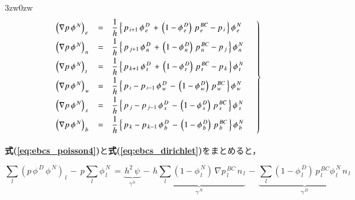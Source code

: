\begin{indentation}{3zw}{0zw}
\begin{equation}
\left .
\begin{array}{lll}
\vspace{1mm}
{\left( \nabla p \,\phi^{\,N} \right)}_{\,e} &=& \displaystyle{ \frac{1}{h}\left\{\,p_{\,i+1}\,\phi^{\,D}_{\,e} \,+\, \left(1-\phi^{\,D}_{\,e}\right)\,p^{\,BC}_{\,e} - p_{\,i} \,\right \} \phi^{\,N}_{\,e} } \\
\vspace{1mm}
{\left( \nabla p \,\phi^{\,N} \right)}_{\,n} &=& \displaystyle{ \frac{1}{h}\left\{\,p_{\,j+1}\,\phi^{\,D}_{\,n} \,+\, \left(1-\phi^{\,D}_{\,n}\right)\,p^{\,BC}_{\,n} - p_{\,j} \,\right \} \phi^{\,N}_{\,n} } \\
\vspace{1mm}
{\left( \nabla p \,\phi^{\,N} \right)}_{\,t} &=& \displaystyle{ \frac{1}{h}\left\{\,p_{\,k+1}\,\phi^{\,D}_{\,t} \,+\, \left(1-\phi^{\,D}_{\,t}\right)\,p^{\,BC}_{\,t} - p_{\,k} \,\right \} \phi^{\,N}_{\,t} } \\
\vspace{1mm}
{\left( \nabla p \,\phi^{\,N} \right)}_{\,w} &=& \displaystyle{ \frac{1}{h}\left\{\,p_{\,i} - p_{\,i-1}\,\phi^{\,D}_{\,w} \,-\, \left(1-\phi^{\,D}_{\,w} \right)\,p^{\,BC}_{\,w} \,\right \} \phi^{\,N}_{\,w} } \\
\vspace{1mm}
{\left( \nabla p \,\phi^{\,N} \right)}_{\,s} &=& \displaystyle{ \frac{1}{h}\left\{\,p_{\,j} - p_{\,j-1}\,\phi^{\,D}_{\,s} \,-\, \left(1-\phi^{\,D}_{\,s} \right)\,p^{\,BC}_{\,s} \,\right \} \phi^{\,N}_{\,s} } \\
\vspace{1mm}
{\left( \nabla p \,\phi^{\,N} \right)}_{\,b} &=& \displaystyle{ \frac{1}{h}\left\{\,p_{\,k} - p_{\,k-1}\,\phi^{\,D}_{\,b} \,-\, \left(1-\phi^{\,D}_{\,b} \right)\,p^{\,BC}_{\,b} \,\right \} \phi^{\,N}_{\,b} } \\
\end{array} \quad \right \}
\label{eq:ebcs_dirichlet}
\end{equation}

\vspace{5mm}
\textbf{式(\ref{eq:ebcs_poisson4})}と\textbf{式(\ref{eq:ebcs_dirichlet})}をまとめると，

\begin{equation}
\sum \limits_l {\left( p \,\phi^{\,D} \,\phi^{\,N} \right)}_{\,l} \,-\, p \sum \limits_l \phi^{\,N}_{\,l}
\,=\,
\underbrace{h^2 \,\psi} \limits_{\gamma^{\,0}}
\,-\, 
\underbrace{ h \sum \limits_l \left( 1-\phi^{\,N}_{\,l} \right) \,\nabla p^{\,BC}_{\,l} \,n_{\,l} } \limits_{\gamma^{\,N}}
\,-\, 
\underbrace{ \sum \limits_l \left(1-\phi^{\,D}_{\,l} \right) \,p^{\,BC}_{\,l} \phi^{\,N}_{\,l} \,n_{\,l} } \limits_{\gamma^{\,D}}
\label{eq:ebcs_poisson3}
\end{equation}


\end{indentation}
